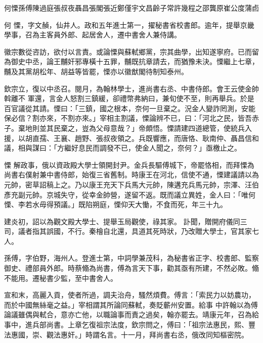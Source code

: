 
\begin{pinyinscope}

 何慄孫傅陳過庭張叔夜聶昌張閣張近鄭僅宇文昌齡子常許幾程之邵龔原崔公度蒲卣



 何
 慄，字文赬，仙井人。政和五年進士第一，擢秘書省校書郎。逾年，提舉京畿學事，召為主客員外郎、起居舍人，遷中書舍人兼侍講。



 徽宗數從咨訪，欲付以言責。或論慄與蘇軾鄉黨，宗其曲學，出知遂寧府。已而留為御史中丞，論王黼奸邪專橫十五罪，黼既抗章請去，而猶豫未決。慄繼上七章，黼及其黨胡松年、胡益等皆罷，慄亦以徽猷閣待制知泰州。



 欽宗立，復以中丞召。閱月，為翰林學士，進尚書右丞、中書侍郎。會王云使金帥斡離不
 軍還，言金人怒割三鎮緩，卻禮幣弗納曰，兼旬使不至，則再舉兵。於是百官議從其請。慄曰：「三鎮，國之根本，奈何一旦棄之。況金人變詐罔測，安能保必信？割亦來，不割亦來。」宰相主割議，慄論辨不已，曰：「河北之民，皆吾赤子。棄地則並其民棄之，豈為父母意哉？」帝頗悟。慄請建四道總管，使統兵入援，以胡直孺、王襄、趙野、張叔夜領之。兵既響應，而唐恪、耿南仲、聶昌信和議，相與謀曰：「方繼好息民而調發不已，使金人聞之，奈何？」亟檄止之。



 慄
 解政事，俄以資政殿大學士領開封尹。金兵長驅傅城下，帝罷恪相，而拜慄為尚書右僕射兼中書侍郎，始復三省舊制。時康王在河北，信使不通，慄建議請以為元帥，密草詔稿上之。乃以康王充天下兵馬大元帥，陳遘充兵馬元帥，宗澤、汪伯彥充副元帥。京城失守，從幸金帥營，遂留不返。既而議立異姓，金人曰：「唯何慄、李若水毋得預議。」既陷朔庭，慄仰天大慟，不食而死，年三十九。



 建炎初，詔以為觀文殿大學士、提舉玉局觀使，祿其家。
 訃聞，贈開府儀同三司，議者指其誤國，不行。秦檜自北還，具道其死時狀，乃改贈大學士，官其家七人。



 孫傅，字伯野，海州人。登進士第，中詞學兼茂科，為秘書省正字、校書郎、監察御史、禮部員外郎。時蔡翛為尚書，傅為言天下事，勸其亟有所建，不然必敗。翛不能用。遷秘書少監，至中書舍人。



 宣和末，高麗入貢，使者所過，調夫治舟，騷然煩費。傅言：「索民力以妨農功，而於中國無絲毫之益。」宰相謂其所論同蘇軾，奏貶蘄州安置。給事
 中許翰以為傅論議雖偶與軾合，意亦亡他，以職論事而責之過矣，翰亦罷去。靖康元年，召為給事中，進兵部尚書。上章乞復祖宗法度，欽宗問之，傅曰：「祖宗法惠民，熙、豐法惠國，崇、觀法惠奸。」時謂名言。十一月，拜尚書右丞，俄改同知樞密院。




\end{pinyinscope}
